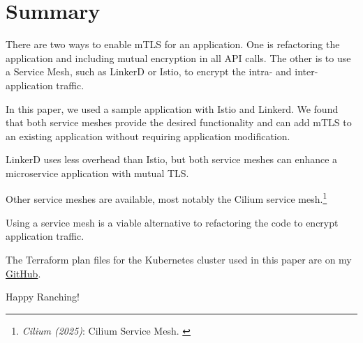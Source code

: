 %
%

\pagebreak
\section{Summary}

\onehalfspacing

There are two ways to enable mTLS for an application. One is refactoring the application and including mutual encryption in all API calls. The other is to use a Service Mesh, such as LinkerD or Istio, to encrypt the intra- and inter-application traffic.

In this paper, we used a sample application with Istio and Linkerd. We found that both service meshes provide the desired functionality and can add mTLS to an existing application without requiring application modification.

LinkerD uses less overhead than Istio, but both service meshes can enhance a microservice application with mutual TLS. 

Other service meshes are available, most notably the Cilium service mesh.\footnote{\textit{Cilium (2025)}: Cilium Service Mesh. \cite{ciliumMesh}}

Using a service mesh is a viable alternative to refactoring the code to encrypt application traffic.

The Terraform plan files for the Kubernetes cluster used in this paper are on my \href{https://github.com/chfrank-cgn/Rancher/tree/master/aks-cluster}{GitHub}.

Happy Ranching!
